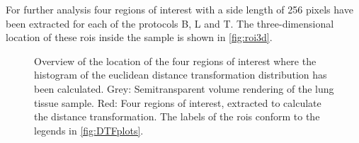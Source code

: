For further analysis four regions of interest with a side length of 256 pixels have been extracted for each of the protocols B, L and T. The three-dimensional location of these \acp{roi} inside the sample is shown in \autoref{fig:roi3d}.

\renewcommand{\imsize}{1.41\linewidth}%
\pgfmathsetlength{\imagewidth}{\linewidth}%
%
\begin{figure}
	\noindent{}%
	\caption[Overview of the location of the four regions of interest in the sample]{Overview of the location of the four regions of interest where the histogram of the euclidean distance transformation distribution has been calculated. Grey: Semitransparent volume rendering of the lung tissue sample. Red: Four regions of interest, extracted to calculate the distance transformation. The labels of the \acp{roi} conform to the legends in \autoref{fig:DTFplots}.}%
	\label{fig:roi3d}
\end{figure}

